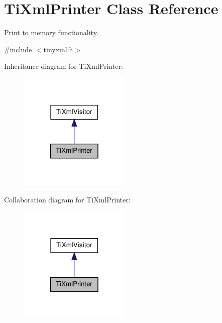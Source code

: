 \hypertarget{classTiXmlPrinter}{
\section{TiXmlPrinter Class Reference}
\label{d4/d3c/classTiXmlPrinter}
}


Print to memory functionality.  




{\ttfamily \#include $<$tinyxml.h$>$}



Inheritance diagram for TiXmlPrinter:
\nopagebreak
\begin{figure}[H]
\begin{center}
\leavevmode
\includegraphics[width=150pt]{de/df6/classTiXmlPrinter__inherit__graph}
\end{center}
\end{figure}


Collaboration diagram for TiXmlPrinter:
\nopagebreak
\begin{figure}[H]
\begin{center}
\leavevmode
\includegraphics[width=150pt]{d5/dd2/classTiXmlPrinter__coll__graph}
\end{center}
\end{figure}
